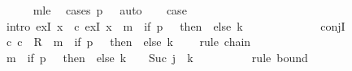 \begin{isabellebody}
\ \ \ \ \isamarkupfalse%
\ m{\isacharunderscore}{\kern0pt}le\ \isamarkupfalse%
\ {\isacharparenleft}{\kern0pt}cases\ {\isachardoublequoteopen}{\isacharquery}{\kern0pt}p\ {\isacharequal}{\kern0pt}\ {}{\isachardoublequoteclose}{\isacharparenright}{\kern0pt}\ auto\isanewline
\ \ \isamarkupfalse%
\ {\isacharquery}{\kern0pt}case\isanewline
\ \ \isamarkupfalse%
\ {\isacharparenleft}{\kern0pt}intro\ exI{\isacharbrackleft}{\kern0pt}\ x\ {\isacharequal}{\kern0pt}\ c{\isacharprime}{\kern0pt}{\isacharbrackright}{\kern0pt}\ exI{\isacharbrackleft}{\kern0pt}\ x\ {\isacharequal}{\kern0pt}\ {\isachardoublequoteopen}m\ {\isacharplus}{\kern0pt}\ {\isacharparenleft}{\kern0pt}if\ {\isacharquery}{\kern0pt}p\ {\isacharequal}{\kern0pt}\ {}\ then\ {}\ else\ {\isacharquery}{\kern0pt}k\ {\isacharplus}{\kern0pt}\ {}{\isacharparenright}{\kern0pt}{\isachardoublequoteclose}{\isacharbrackright}{\kern0pt}\isanewline
\ \ \ \ \ \ \ \ \ \ \ conjI{\isacharparenright}{\kern0pt}\isanewline
\ \ \ \ \isamarkupfalse%
\ {\isachardoublequoteopen}{\isacharparenleft}{\kern0pt}c{}{\isacharcomma}{\kern0pt}\ c{\isacharprime}{\kern0pt}{\isacharparenright}{\kern0pt}\ {\isasymin}\ R{\isacharprime}{\kern0pt}\ {\isacharcircum}{\kern0pt}{\isacharcircum}{\kern0pt}\ {\isacharparenleft}{\kern0pt}m\ {\isacharplus}{\kern0pt}\ {\isacharparenleft}{\kern0pt}if\ {\isacharquery}{\kern0pt}p\ {\isacharequal}{\kern0pt}\ {}\ then\ {}\ else\ {\isacharquery}{\kern0pt}k\ {\isacharplus}{\kern0pt}\ {}{\isacharparenright}{\kern0pt}{\isacharparenright}{\kern0pt}{\isachardoublequoteclose}\ \isamarkupfalse%
\ {\isacharparenleft}{\kern0pt}rule\ chain{\isacharparenright}{\kern0pt}\isanewline
\ \ \ \ \isamarkupfalse%
\ {\isachardoublequoteopen}m\ {\isacharplus}{\kern0pt}\ {\isacharparenleft}{\kern0pt}if\ {\isacharquery}{\kern0pt}p\ {\isacharequal}{\kern0pt}\ {}\ then\ {}\ else\ {\isacharquery}{\kern0pt}k\ {\isacharplus}{\kern0pt}\ {}{\isacharparenright}{\kern0pt}\ {\isasymle}\ Suc\ j\ {\isacharasterisk}{\kern0pt}\ {\isacharparenleft}{\kern0pt}{\isacharquery}{\kern0pt}k\ {\isacharplus}{\kern0pt}\ {}{\isacharparenright}{\kern0pt}{\isachardoublequoteclose}\isanewline
\ \ \ \ \ \ \isamarkupfalse%
\ {\isacharparenleft}{\kern0pt}rule\ bound{\isacharparenright}{\kern0pt}\isanewline
\ \ \ \ \isamarkupfalse%

\end{isabellebody}
